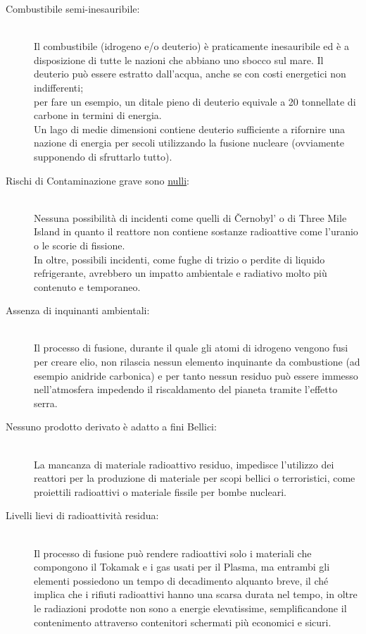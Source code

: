 \begin{description}
	\item [Combustibile semi-inesauribile:]\phantom{.}\\
	      Il combustibile (idrogeno e/o deuterio) è praticamente inesauribile ed è a disposizione di tutte le nazioni che abbiano uno sbocco sul mare. Il deuterio può essere estratto dall'acqua, anche se con costi energetici non indifferenti;\\
	      per fare un esempio, un ditale pieno di deuterio equivale a 20 tonnellate di carbone in termini di energia.\\
	      Un lago di medie dimensioni contiene deuterio sufficiente a rifornire una nazione di energia per secoli utilizzando la fusione nucleare (ovviamente supponendo di sfruttarlo tutto).
	\item [Rischi di Contaminazione grave sono \underline{nulli}:]\phantom{.}\\
	      Nessuna possibilità di incidenti come quelli di Černobyl' o di Three Mile Island in quanto il reattore non contiene sostanze radioattive come l'uranio o le scorie di fissione.\\
	      In oltre, possibili incidenti, come fughe di trizio o perdite di liquido refrigerante, avrebbero un impatto ambientale e radiativo molto più contenuto e temporaneo.
	\item [Assenza di inquinanti ambientali:]\phantom{.}\\
	      Il processo di fusione, durante il quale gli atomi di idrogeno vengono fusi per creare elio, non rilascia nessun elemento inquinante da combustione (ad esempio anidride carbonica) e per tanto nessun residuo può essere immesso nell'atmosfera impedendo il riscaldamento del pianeta tramite l'effetto serra.
	\item [Nessuno prodotto derivato è adatto a fini Bellici:]\phantom{.}\\
	      La mancanza di materiale radioattivo residuo, impedisce l'utilizzo dei reattori per la produzione di materiale per scopi bellici o terroristici, come proiettili radioattivi o materiale fissile per bombe nucleari.
	\item [Livelli lievi di radioattività residua:]\phantom{.}\\
	      Il processo di fusione può rendere radioattivi solo i materiali che compongono il Tokamak e i gas usati per il Plasma, ma entrambi gli elementi possiedono un tempo di decadimento alquanto breve, il ché implica che i rifiuti radioattivi hanno una scarsa durata nel tempo, in oltre le radiazioni prodotte non sono a energie elevatissime, semplificandone il contenimento attraverso contenitori schermati più economici e sicuri.
\end{description}
